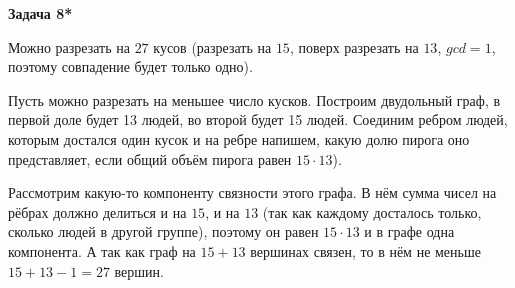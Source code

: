 \begin{center}
\textbf{Задача 8*}
\end{center}
Можно разрезать на $\displaystyle 27$ кусов (разрезать на $\displaystyle 15$, поверх разрезать на $\displaystyle 13$, $\displaystyle gcd=1$, поэтому совпадение будет только одно).

Пусть можно разрезать на меньшее число кусков. Построим двудольный граф, в первой доле будет 13 людей, во второй будет 15 людей. Соединим ребром людей, которым достался один кусок и на ребре напишем, какую долю пирога оно представляет, если общий объём пирога равен $\displaystyle 15\cdotp 13$).

Рассмотрим какую-то компоненту связности этого графа. В нём сумма чисел на рёбрах должно делиться и на $\displaystyle 15$, и на $\displaystyle 13$ (так как каждому досталось только, сколько людей в другой группе), поэтому он равен $\displaystyle 15\cdotp 13$ и в графе одна компонента. А так как граф на $\displaystyle 15+13$ вершинах связен, то в нём не меньше $\displaystyle 15+13-1=27$ вершин.